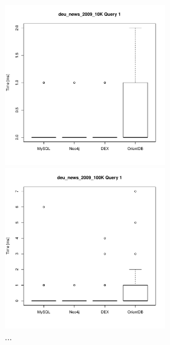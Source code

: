\documentclass[11pt, a4paper, oneside]{article} %
\begin{document}
\begin{appendix}
\begin{figure}[ht]
\begin{minipage}[hbt]{7cm}
	\centering
	\includegraphics[width=7cm]{../results/cold caches/images/10K_query1_boxplot}
	\caption{...}
	\label{fig:10k_query2_boxplot}
\end{minipage}
\hfill
\begin{minipage}[hbt]{7cm}
	\centering
	\includegraphics[width=7cm]{../results/cold caches/images/100K_query1_boxplot}
	\caption{...}
	\label{fig:100k_query1_boxplot}
\end{minipage}


\end{figure}
\end{appendix}
\end{document}
